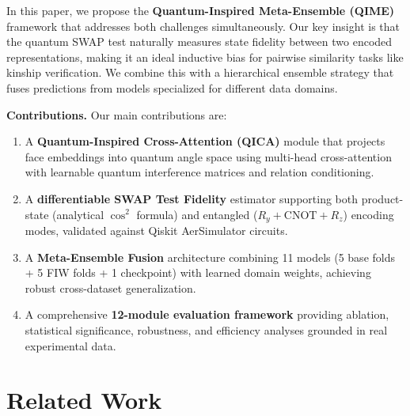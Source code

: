 \documentclass[journal,12pt]{IEEEtran}
\begin{document}
In this paper, we propose the \textbf{Quantum-Inspired Meta-Ensemble (QIME)}
framework that addresses both challenges simultaneously. Our key insight
is that the quantum SWAP test naturally measures state fidelity between
two encoded representations, making it an ideal inductive bias for
pairwise similarity tasks like kinship verification. We combine this with
a hierarchical ensemble strategy that fuses predictions from models
specialized for different data domains.

\textbf{Contributions.} Our main contributions are:
\begin{enumerate}
    \item A \textbf{Quantum-Inspired Cross-Attention (QICA)} module that
          projects face embeddings into quantum angle space using multi-head
          cross-attention with learnable quantum interference matrices and
          relation conditioning.
    \item A \textbf{differentiable SWAP Test Fidelity} estimator supporting
          both product-state (analytical $\cos^2$ formula) and entangled
          ($R_y + \text{CNOT} + R_z$) encoding modes, validated against
          Qiskit AerSimulator circuits.
    \item A \textbf{Meta-Ensemble Fusion} architecture combining 11 models
          (5 base folds + 5 FIW folds + 1 checkpoint) with learned domain
          weights, achieving robust cross-dataset generalization.
    \item A comprehensive \textbf{12-module evaluation framework} providing
          ablation, statistical significance, robustness, and efficiency
          analyses grounded in real experimental data.
\end{enumerate}

\section{Related Work}
\label{sec:related_work}
\end{document}

